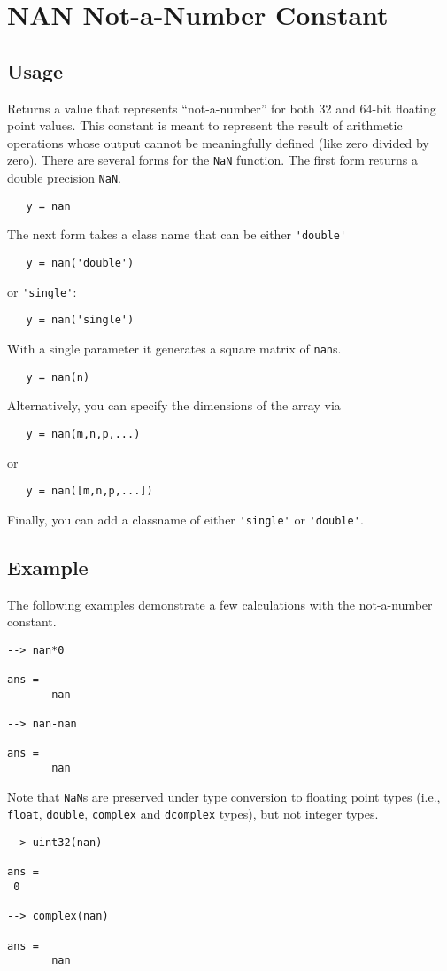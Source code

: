 \section{NAN Not-a-Number Constant}

\subsection{Usage}

Returns a value that represents ``not-a-number'' for both 32 and 64-bit 
floating point values.  This constant is meant to represent the result of
arithmetic operations whose output cannot be meaningfully defined (like 
zero divided by zero).  There are several forms for the \verb|NaN| function.
The first form returns a double precision \verb|NaN|.
\begin{verbatim}
   y = nan
\end{verbatim}
The next form takes a class name that can be either \verb|'double'| 
\begin{verbatim}
   y = nan('double')
\end{verbatim}
or \verb|'single'|:
\begin{verbatim}
   y = nan('single')
\end{verbatim}
With a single parameter it generates a square matrix of \verb|nan|s.
\begin{verbatim}
   y = nan(n)
\end{verbatim}
Alternatively, you can specify the dimensions of the array via
\begin{verbatim}
   y = nan(m,n,p,...)
\end{verbatim}
or
\begin{verbatim}
   y = nan([m,n,p,...])
\end{verbatim}
Finally, you can add a classname of either \verb|'single'| or \verb|'double'|.
\subsection{Example}

The following examples demonstrate a few calculations with the not-a-number constant.
\begin{verbatim}
--> nan*0

ans = 
       nan 

--> nan-nan

ans = 
       nan 
\end{verbatim}
Note that \verb|NaN|s are preserved under type conversion to floating point types (i.e., \verb|float|, \verb|double|, \verb|complex| and \verb|dcomplex| types), but not integer  types.
\begin{verbatim}
--> uint32(nan)

ans = 
 0 

--> complex(nan)

ans = 
       nan 
\end{verbatim}
